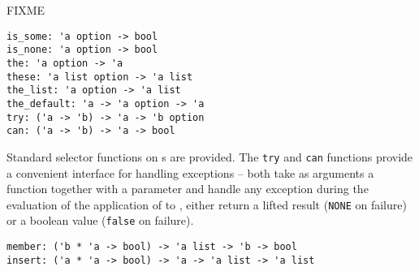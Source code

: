 \begin{isabellebody}
\begin{isamarkuptext}
\begin{mldecls}
  \end{mldecls}%
\end{isamarkuptext}%
\isamarkuptrue%
%
\endisatagmlref
{\isafoldmlref}%
%
\isadelimmlref
%
\endisadelimmlref
%
\begin{isamarkuptext}%
\noindent FIXME%
\end{isamarkuptext}%
\isamarkuptrue%
%
\isamarkuptrue%
%
\isadelimmlref
%
\endisadelimmlref
%
\isatagmlref
%
\begin{isamarkuptext}%
\begin{mldecls}
  \verb|is_some: 'a option -> bool| \\
  \verb|is_none: 'a option -> bool| \\
  \verb|the: 'a option -> 'a| \\
  \verb|these: 'a list option -> 'a list| \\
  \verb|the_list: 'a option -> 'a list| \\
  \verb|the_default: 'a -> 'a option -> 'a| \\
  \verb|try: ('a -> 'b) -> 'a -> 'b option| \\
  \verb|can: ('a -> 'b) -> 'a -> bool| \\
  \end{mldecls}%
\end{isamarkuptext}%
\isamarkuptrue%
%
\endisatagmlref
{\isafoldmlref}%
%
\isadelimmlref
%
\endisadelimmlref
%
\begin{isamarkuptext}%
Standard selector functions on s are provided.  The
  \verb|try| and \verb|can| functions provide a convenient interface for
  handling exceptions -- both take as arguments a function 
  together with a parameter  and handle any exception during
  the evaluation of the application of  to , either
  return a lifted result (\verb|NONE| on failure) or a boolean value
  (\verb|false| on failure).%
\end{isamarkuptext}%
\isamarkuptrue%
%
\isamarkuptrue%
%
\isamarkuptrue%
%
\begin{isamarkuptext}%
\begin{mldecls}
  \verb|member: ('b * 'a -> bool) -> 'a list -> 'b -> bool| \\
  \verb|insert: ('a * 'a -> bool) -> 'a -> 'a list -> 'a list| \\

\end{mldecls}
\end{isamarkuptext}
\end{isabellebody}
